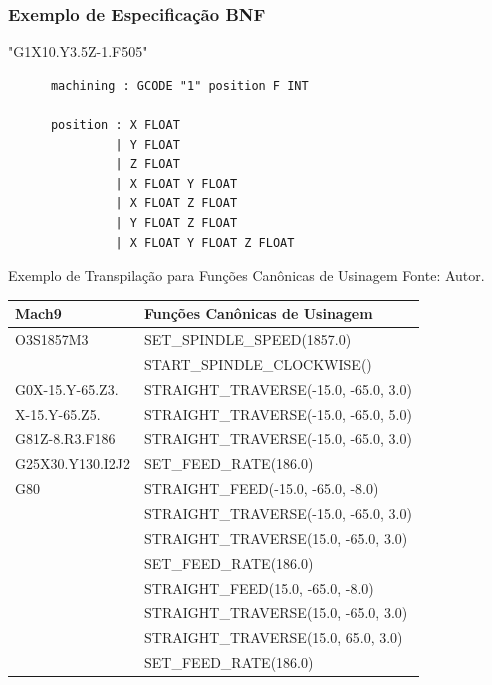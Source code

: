 \documentclass[aspectratio=169]{beamer}
\begin{document}
{\begin{frame}[fragile]
  \frametitle{Exemplo de Especificação BNF}
  \begin{example}
   "G1X10.Y3.5Z-1.F505"
    \begin{lstlisting}
      machining : GCODE "1" position F INT

      position : X FLOAT
               | Y FLOAT
               | Z FLOAT
               | X FLOAT Y FLOAT
               | X FLOAT Z FLOAT
               | Y FLOAT Z FLOAT
               | X FLOAT Y FLOAT Z FLOAT
    \end{lstlisting}
  \end{example}  
\end{frame}


\begin{frame}{Exemplo de Transpilação para Funções Canônicas de Usinagem}
  \scriptsize{Fonte: Autor.}
  \begin{table}[H]
    \centering
    \begin{tabular}{ |l|l| } 
      \hline
      \tiny{\bfseries{Mach9}} & \tiny{\bfseries{Funções Canônicas de Usinagem}} \\
      \hline
      \tiny{O3S1857M3} & \tiny{SET\_SPINDLE\_SPEED(1857.0)} \\
      & \tiny{START\_SPINDLE\_CLOCKWISE()} \\
      \hline
      \tiny{G0X-15.Y-65.Z3.} & \tiny{STRAIGHT\_TRAVERSE(-15.0, -65.0, 3.0)} \\
      \hline
      \tiny{X-15.Y-65.Z5.} & \tiny{STRAIGHT\_TRAVERSE(-15.0, -65.0, 5.0)} \\
      \hline
      \tiny{G81Z-8.R3.F186} & \tiny{STRAIGHT\_TRAVERSE(-15.0, -65.0, 3.0)} \\
      \tiny{G25X30.Y130.I2J2} & \tiny{SET\_FEED\_RATE(186.0)} \\
      \tiny{G80} & \tiny{STRAIGHT\_FEED(-15.0, -65.0, -8.0)} \\
      & \tiny{STRAIGHT\_TRAVERSE(-15.0, -65.0, 3.0)} \\
      & \tiny{STRAIGHT\_TRAVERSE(15.0, -65.0, 3.0)} \\
      & \tiny{SET\_FEED\_RATE(186.0)} \\
      & \tiny{STRAIGHT\_FEED(15.0, -65.0, -8.0)} \\
      & \tiny{STRAIGHT\_TRAVERSE(15.0, -65.0, 3.0)} \\
      & \tiny{STRAIGHT\_TRAVERSE(15.0, 65.0, 3.0)} \\
      & \tiny{SET\_FEED\_RATE(186.0)} \\

\end{tabular}
\end{table}
\end{frame}}
\end{document}
